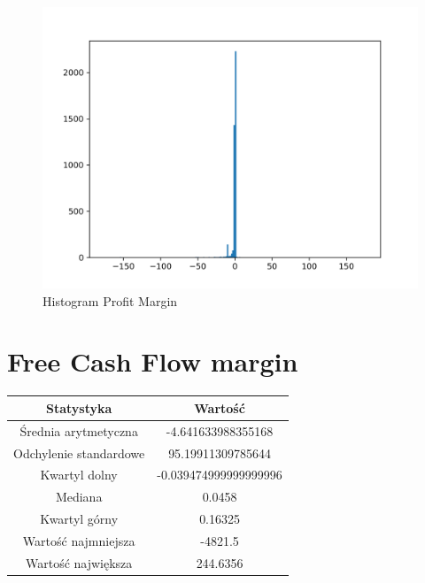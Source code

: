 \documentclass{article}
\begin{document}
\begin{figure}[h!]
    \includegraphics[width=\linewidth]{variables/Profit Margin.png}
    \caption{Histogram Profit Margin }
\end{figure}\section{ Free Cash Flow margin }

\begin{center}
    \begin{tabular}{|c | c|} 
    \hline
    Statystyka & Wartość \\
    \hline\hline
    Średnia arytmetyczna & -4.641633988355168 \\ 
    \hline
    Odchylenie standardowe & 95.19911309785644 \\
    \hline
    Kwartyl dolny & -0.039474999999999996 \\
    \hline
    Mediana & 0.0458 \\
    \hline
    Kwartyl górny & 0.16325 \\
    \hline
    Wartość najmniejsza & -4821.5 \\
    \hline
    Wartość największa & 244.6356 \\
    \hline
   \end{tabular}
\end{center}
\end{document}
